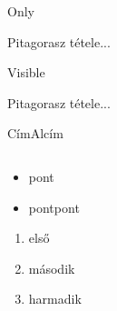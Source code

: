 \documentclass[aspectratio=169, bigger, xcolor=table]{beamer}
\begin{document}
    \begin{frame}{Only}
        \begin{theorem}
            Pitagorasz tétele...
        \end{theorem}
        
    \end{frame}
    
    \begin{frame}{Visible}
        \begin{theorem}
            Pitagorasz tétele...
        \end{theorem}
        
    \end{frame}
    
    \begin{frame}{Cím}{Alcím}
        \begin{columns}[t]
            \begin{column}{.5\linewidth}
                \begin{itemize}
                    \item pont
                    \item pontpont
                \end{itemize}
                
                \begin{enumerate}
                    \item első
                    \item második
                    \item harmadik
                \end{enumerate}
            \end{column}
            
            \begin{column}{.5\linewidth}
            \transfade 
            \end{column}
        \end{columns}
    \end{frame}
    
\end{document}
